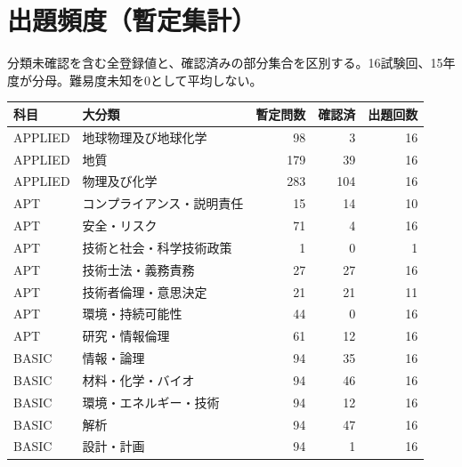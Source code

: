 \chapter{出題頻度（暫定集計）}
分類未確認を含む全登録値と、確認済みの部分集合を区別する。16試験回、15年度が分母。難易度未知を0として平均しない。
\begin{longtable}{p{.16\linewidth}p{.42\linewidth}rrr}
科目 & 大分類 & 暫定問数 & 確認済 & 出題回数\\\hline
APPLIED & 地球物理及び地球化学 & 98 & 3 & 16\\
APPLIED & 地質 & 179 & 39 & 16\\
APPLIED & 物理及び化学 & 283 & 104 & 16\\
APT & コンプライアンス・説明責任 & 15 & 14 & 10\\
APT & 安全・リスク & 71 & 4 & 16\\
APT & 技術と社会・科学技術政策 & 1 & 0 & 1\\
APT & 技術士法・義務責務 & 27 & 27 & 16\\
APT & 技術者倫理・意思決定 & 21 & 21 & 11\\
APT & 環境・持続可能性 & 44 & 0 & 16\\
APT & 研究・情報倫理 & 61 & 12 & 16\\
BASIC & 情報・論理 & 94 & 35 & 16\\
BASIC & 材料・化学・バイオ & 94 & 46 & 16\\
BASIC & 環境・エネルギー・技術 & 94 & 12 & 16\\
BASIC & 解析 & 94 & 47 & 16\\
BASIC & 設計・計画 & 94 & 1 & 16\\
\end{longtable}
